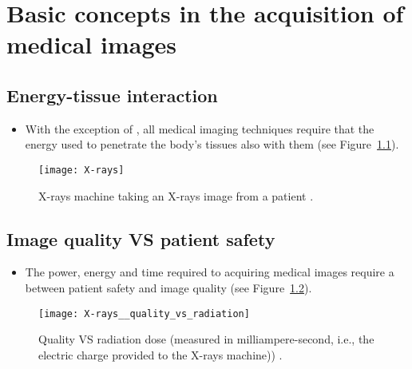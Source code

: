 
\chapter{Basic concepts in the acquisition of medical images}

\section{Energy-tissue interaction}
\begin{itemize}
\item With the exception of , all medical imaging
  techniques require that the energy used to penetrate the body's
  tissues also  with them \cite{bushberg2011essential} (see
  Figure~\ref{fig:X-rays}).
\end{itemize}
\vspace{-0ex}
\begin{figure}[!h]
  \centering
  \texttt{[image: X-rays]}
  \caption{X-rays machine taking an X-rays image from a
    patient \cite{CC2025Xray}.\label{fig:X-rays}}
\end{figure}

\section{Image quality VS patient safety}
\begin{itemize}
\item The power, energy and time required to acquiring medical images
  require a  between patient safety and image quality
  \cite{bushberg2011essential} (see
  Figure~\ref{fig:quality_vs_radiation}).
\end{itemize}
\vspace{-0ex}
\begin{figure}[!h]
  \centering
  \texttt{[image: X-rays\_\_quality\_vs\_radiation]}
  \caption{Quality VS radiation dose (measured in milliampere-second,
    i.e., the electric charge provided to the X-rays
    machine))
    \cite{huda2015radiographic}.\label{fig:quality_vs_radiation}}
\end{figure}

